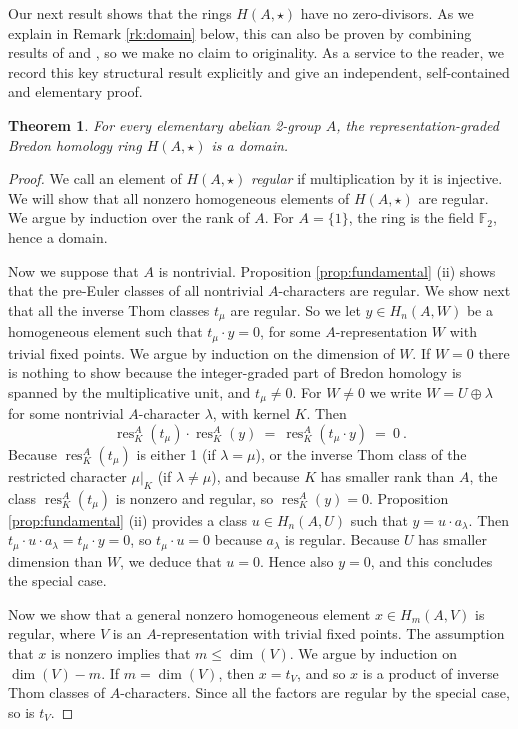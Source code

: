 \documentclass{amsart}[12pt]
\DeclareMathOperator{\res}{res}
\newcommand{\mF}{{\mathbb F}}
\numberwithin{equation}{section}
\newtheorem{theorem}[equation]{Theorem}
\theoremstyle{definition}
\begin{document}
Our next result shows that the rings $H(A,\star)$ have no zero-divisors.
As we explain in Remark \ref{rk:domain} below, this can also be proven
by combining results of \cite{holler-kriz} and \cite{skriz},
so we make no claim to originality.
As a service to the reader, we record this key structural result explicitly and
give an independent, self-contained and elementary proof.

\begin{theorem}\label{thm:domain}
  For every elementary abelian 2-group $A$, the representation-graded Bredon homology
  ring $H(A,\star)$ is a domain.
\end{theorem}
\begin{proof}
  We call an element of $H(A,\star)$ {\em regular} if multiplication by it is injective.
  We will show that all nonzero homogeneous elements of $H(A,\star)$ are regular.
  We argue by induction over the rank of $A$.
  For $A=\{1\}$, the ring is the field $\mF_2$, hence a domain.

  Now we suppose that $A$ is nontrivial.
  Proposition \ref{prop:fundamental} (ii) shows that the pre-Euler classes
  of all nontrivial $A$-characters are regular.
  We show next that all the inverse Thom classes $t_\mu$ are regular.
  So we let $y\in H_n(A,W)$ be a homogeneous element such that $t_\mu\cdot y=0$,
  for some $A$-representation $W$ with trivial fixed points.
  We argue by induction on the dimension of $W$.
  If $W=0$ there is nothing to show because the integer-graded part of Bredon homology
  is spanned by the multiplicative unit, and $t_\mu\ne 0$.
  For $W\ne 0$ we write $W=U\oplus\lambda$ for some nontrivial $A$-character $\lambda$,
  with kernel $K$.
  Then 
  \[  \res^A_K(t_\mu)\cdot \res^A_K(y) \  =\ \res^A_K(t_\mu\cdot y)\ =\ 0\ .\]
  Because $\res^A_K(t_\mu)$ is either 1 (if $\lambda=\mu$),
  or the inverse Thom class of the restricted character $\mu|_K$
  (if $\lambda\ne\mu$), and because $K$ has smaller rank than $A$,
  the class $\res^A_K(t_\mu)$ is nonzero and regular, so $\res^A_K(y)=0$.
  Proposition \ref{prop:fundamental} (ii)
  provides a class $u\in H_n(A,U)$ such that $y= u\cdot a_\lambda$.
  Then $t_\mu\cdot u\cdot a_\lambda=t_\mu\cdot y=0$, so
  $t_\mu\cdot u=0$  because $a_\lambda$ is regular.
  Because $U$ has smaller dimension than $W$,
  we deduce that $u=0$.  Hence also $y=0$, and this concludes the special case.

  Now we show that a general nonzero homogeneous element $x\in H_m(A,V)$ is regular,
  where $V$ is an $A$-representation with trivial fixed points.
  The assumption that $x$ is nonzero implies that $m\leq \dim(V)$.
  We argue by induction on $\dim(V)-m$.
  If $m=\dim(V)$, then $x=t_V$, and so $x$ is a product of inverse Thom classes
  of $A$-characters. Since all the factors are regular by the special case, so is $t_V$.


\end{proof}
\end{document}
